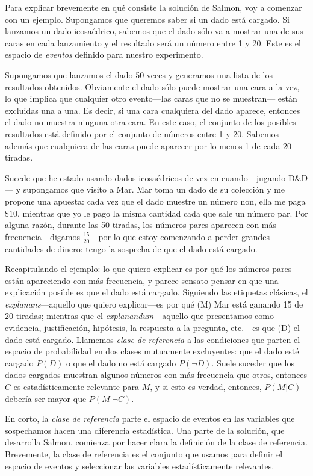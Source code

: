Para explicar brevemente en qué consiste la solución de
Salmon, voy a comenzar con un ejemplo. Supongamos que
queremos saber si un dado está cargado. Si lanzamos un dado
icosaédrico, sabemos que el dado sólo va a mostrar una de sus caras en
cada lanzamiento y el resultado será un número entre 1 y 20.
Este es el espacio de \emph{eventos} definido para nuestro
experimento.

Supongamos que lanzamos el dado 50 veces y generamos una
lista de los resultados obtenidos. Obviamente el dado sólo
puede mostrar una cara a la vez, lo que implica que
cualquier otro evento---las caras que no se muestran---
están excluidas una a una. Es decir, si una cara cualquiera
del dado aparece, entonces el dado no muestra ninguna otra
cara. En este caso, el conjunto de los posibles resultados
está definido por el conjunto de números entre 1 y 20.
Sabemos además que cualquiera de las caras puede aparecer
por lo menos 1 de cada 20 tiradas.

Sucede que he estado usando dados icosaédricos de vez en
cuando---jugando D\&D--- y supongamos que visito a Mar. Mar
toma un dado de su colección y me propone una apuesta: cada
vez que el dado muestre un número non, ella me paga $ \$10
$, mientras que yo le pago la misma cantidad cada que sale
un número par. Por alguna razón, durante las 50 tiradas, los
números pares aparecen con más frecuencia---digamos $
\frac{15}{20} $---por lo que estoy comenzando a perder
grandes cantidades de dinero: tengo la sospecha de que el
dado está cargado.

Recapitulando el ejemplo: lo que quiero explicar es por qué
los números pares están apareciendo con más frecuencia, y
parece sensato pensar en que una explicación posible es que
el dado está cargado. Siguiendo las etiquetas clásicas, el
\emph{explanans}---aquello que quiero explicar---es por qué
(M) Mar está ganando 15 de 20 tiradas; mientras que el
\emph{explanandum}---aquello que presentamos como evidencia,
justificación, hipótesis, la respuesta a la pregunta,
etc.---es que (D) el dado está cargado. Llamemos \emph{clase
de referencia} a las condiciones que parten el espacio de
probabilidad en dos clases mutuamente excluyentes: que el
dado esté cargado $P(D) $ o que el dado no está cargado
$P(\neg D)$. Suele suceder que los dados cargados muestran
algunos números con más frecuencia que otros, entonces $ C $
es estadísticamente relevante para $ M $, y si esto es
verdad, entonces, $ P( M | C ) $ debería ser mayor que $ P(M
| \neg C ) $.

En corto, la \emph{clase de referencia} parte el espacio de
eventos en las variables que sospechamos hacen una
diferencia estadística. Una parte de la solución, que
desarrolla Salmon, comienza por hacer clara la definición de
la clase de referencia. Brevemente, la clase de referencia
es el conjunto que usamos para definir el espacio de eventos
y seleccionar las variables estadísticamente relevantes.

